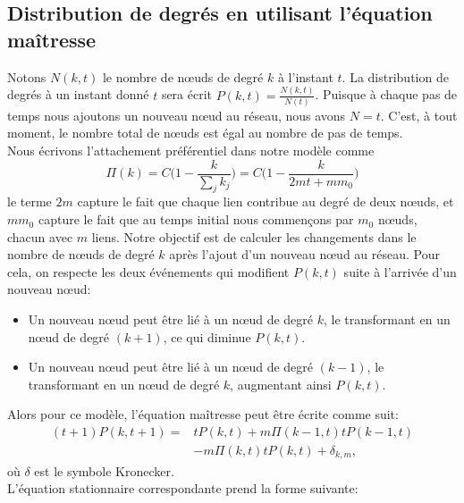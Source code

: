    \subsection{Distribution de degrés en utilisant l'équation maîtresse}
   Notons $N(k,t)$ le nombre de nœuds de degré $k$ à l'instant $t$. La distribution de degrés à un instant donné $t$ sera écrit $P(k,t)=\frac{N(k,t)}{N(t)}$. Puisque à chaque pas de temps nous ajoutons un nouveau nœud au réseau, nous avons $N=t$. C'est, à tout moment, le nombre total de nœuds est égal au nombre de pas de temps.\\
   Nous écrivons l'attachement préférentiel dans notre modèle comme
   \begin{equation}
   \Pi(k)=C\big(1-\frac{k}{\sum_jk_j}\big)=C\big(1-\frac{k}{2mt+mm_0}\big)
   \end{equation}
   le terme $2m$ capture le fait que chaque lien contribue au degré de deux nœuds, et $mm_0$ capture le fait que au temps initial nous commençons par $m_0$ nœuds, chacun avec $m$ liens. Notre objectif est de calculer les changements dans le nombre de nœuds de degré $k$ après l'ajout d'un nouveau nœud au réseau. Pour cela, on respecte les deux événements qui modifient $P(k,t)$ suite à l'arrivée d'un nouveau nœud:
   \begin{itemize}
   	\item Un nouveau nœud peut être lié à un nœud de degré $k$, le transformant en un nœud de degré $(k+1)$, ce qui diminue $P(k,t)$.
   	\item Un nouveau nœud peut être lié à un nœud de degré $(k-1)$, le transformant en un nœud de degré $k$, augmentant ainsi $P(k,t)$.
   \end{itemize}
  Alors pour ce modèle, l'équation maîtresse peut être écrite comme suit:
   \begin{equation}
   \begin{aligned}
  (t+1)P(k,t+1)= &tP(k,t)+m\Pi(k-1,t)tP(k-1,t)\\
   & -m\Pi(k,t)tP(k,t)+\delta_{k,m},
  \end{aligned}
 \end{equation}
  où $\delta$ est le symbole Kronecker.\\
  L'équation stationnaire correspondante prend la forme suivante:
  
